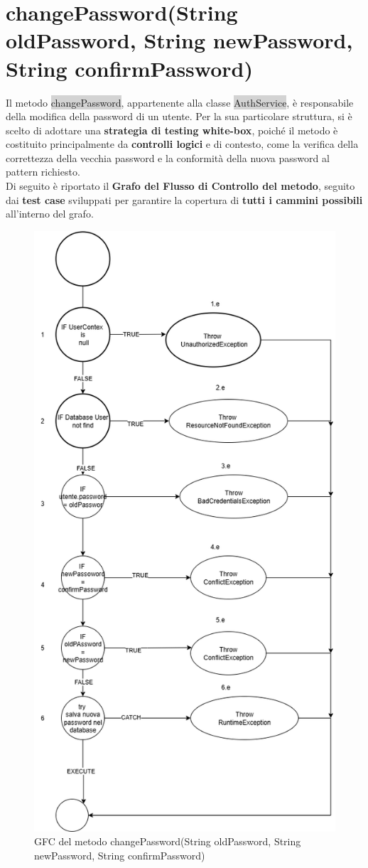 \section{changePassword(String oldPassword, String newPassword, String confirmPassword)}

Il metodo \colorbox{lightgray}{changePassword}, appartenente alla classe \colorbox{lightgray}{AuthService}, è responsabile della modifica della password di un utente. Per la sua particolare struttura, si è scelto di adottare una \textbf{strategia di testing white-box}, poiché il metodo è costituito principalmente da \textbf{controlli logici} e di contesto, come la verifica della correttezza della vecchia password e la conformità della nuova password al pattern richiesto.
\\
Di seguito è riportato il \textbf{Grafo del Flusso di Controllo del metodo}, seguito dai \textbf{test case} sviluppati per garantire la copertura di \textbf{tutti i cammini possibili} all’interno del grafo.

\begin{figure}[H]
	\centering
	\includegraphics[width=0.7\linewidth]{Immagini/unit test/grafoCambiaPassword.png}
	\caption[GFC changePassword]{GFC del metodo changePassword(String oldPassword, String newPassword, String confirmPassword)}
\end{figure}

